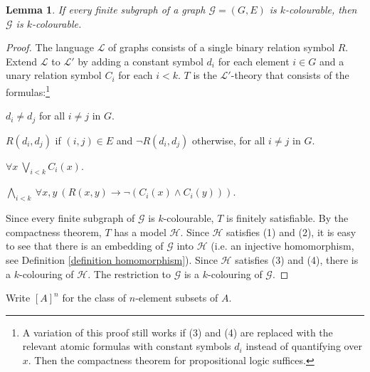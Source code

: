 \documentclass[a4paper, 11pt]{amsart}
\newtheorem{lemma}[lemma]{Lemma}
\theoremstyle{remark}
\newcommand{\cG}{\mathcal G}
\newcommand{\cL}{\mathcal L}
\newenvironment{enumerate-(1)}{\begin{enumerate}[label={\upshape (\arabic*)}, leftmargin=2pc]}{\end{enumerate}}
\begin{document}
\begin{lemma} 
If every finite subgraph of a graph $\cG=(G,E)$ is $k$-colourable, then $\cG$ is $k$-colourable.
\end{lemma} 
\begin{proof} 
The language $\cL$ of graphs consists of a single binary relation symbol $R$. 
Extend $\cL$ to $\cL'$ by adding a constant symbol $d_i$ for each element $i\in G$ and a unary relation symbol $C_i$ for each $i<k$. 
$T$ is the $\cL'$-theory that consists of the formulas:\footnote{A variation of this proof still works if (3) and (4) are replaced with the relevant atomic formulas with constant symbols $d_i$ instead of quantifying over $x$. Then the compactness theorem for propositional logic suffices. }  
\begin{enumerate-(1)} 
\item 
$d_i\neq d_j$ for all $i\neq j$ in $G$. 
\item 
$R(d_i,d_j)$ if  $(i,j)\in E$ and $\neg R(d_i,d_j)$ otherwise, for all $i\neq j$ in $G$. 
\item 
$\forall x\ \bigvee_{i<k} C_i(x)$. 
\item 
$\bigwedge_{i<k} \ \forall x,y\ ( R(x,y) \rightarrow \neg (C_i(x) \wedge C_i(y)))$. 
\end{enumerate-(1)} 
Since every finite subgraph of $\cG$ is $k$-colourable, $T$ is finitely satisfiable. 
By the compactness theorem, $T$ has a model $\mathcal{H}$. 
Since $\mathcal{H}$ satisfies (1) and (2), it is easy to see that there is an embedding of $\cG$ into $\mathcal{H}$ (i.e. an injective homomorphism, see Definition \ref{definition homomorphism}). 
Since $\mathcal{H}$ satisfies (3) and (4), there is a $k$-colouring of $\mathcal{H}$. 
The restriction to $\cG$ is a $k$-colouring of $\cG$. 
\end{proof} 





Write $[A]^n$ for the class of $n$-element subsets of $A$. 
\end{document}
